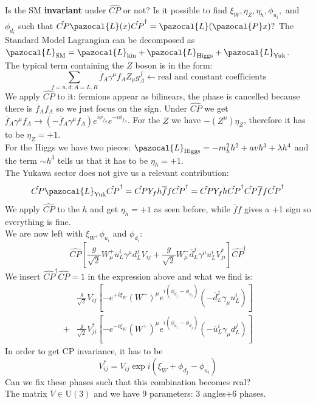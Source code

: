 \documentclass[../main.tex]{subfiles}
\begin{document}
Is the SM \textbf{invariant} under $\hat{CP}$ or not?  Is it possible to find $\xi_W, \eta_Z, \eta_h, \phi_{u_i},$ and $\phi_{d_i}$ such that $\hat{CP}\pazocal{L}(x)\hat{CP}^\dagger=\pazocal{L}(\pazocal{P}x)?$ The Standard Model Lagrangian can be decomposed as $\pazocal{L}_{\text{SM}}=\pazocal{L}_{\text{kin}}+\pazocal{L}_{\text{Higgs}}+\pazocal{L}_{\text{Yuk}}$.\\
The typical term containing the $Z$ boson is in the form:
\[
\sum_{f=u,d;A=L,R}\overline{f}_A\gamma^\mu f_AZ_\mu g_A^f\xleftarrow[]{}\text{real and constant coefficients}
\]
We apply $\hat{CP}$ to it: fermions appear as bilinears, the phase is cancelled because there is $\overline{f}_Af_A$ so we just focus on the sign. Under $\hat{CP}$ we get $\overline{f}_A\gamma^\mu f_A\xrightarrow[]{}(-\overline{f}_A\gamma^\mu f_A)e^{i\phi_{f_A}}e^{-i\phi_{f_A}}$. For the $Z$ we have $-(Z^\mu)\eta_Z$, therefore it has to be $\eta_Z=+1$.\\
For the Higgs we have two pieces: $\pazocal{L}_{\text{Higgs}}=-m_h^2h^2+avh^3+\lambda h^4$ and the term $\sim h^3$ tells us that it has to be $\eta_h=+1$.\\
The Yukawa sector does not give us a relevant contribution:
\[
\hat{CP}\pazocal{L}_{\text{Yuk}}\hat{CP}^\dagger=\hat{CP}Y_fh\overline{f}f\hat{CP}^\dagger=\hat{CP}Y_fh\hat{CP}^\dagger\hat{CP}\overline{f}f\hat{CP}^\dagger
\]
We apply $\hat{CP}$ to the $h$ and get $\eta_h=+1$ as seen before, while $\overline{f}f$ gives a +1 sign so everything is fine.\\
We are now left with $\xi_W, \phi_{u_i}$ and $\phi_{d_i}$:
\[
\hat{CP}\left[\frac{g}{\sqrt{2}}W_\mu^+\overline{u}_L^i\gamma^\mu d^j_LV_{ij}+\frac{g}{\sqrt{2}}W_\mu^-\overline{d}_L^j\gamma^\mu u_L^iV_{ji}^*\right]\hat{CP}^\dagger
\]
We insert $\hat{CP}^\dagger\hat{CP}=1$ in the expression above and what we find is:
\begin{align*}
&\frac{g}{\sqrt{2}}V_{ij}\left[-e^{+i\xi_W}(W^-)^\mu e^{i(\phi_{d_j}-\phi_{u_i})}\left(-\overline{d}_L^j\gamma_\mu u_L^i\right)\right]\\
+&\frac{g}{\sqrt{2}}V_{ji}^*\left[-e^{-i\xi_W}(W^+)^\mu e^{i(\phi_{u_i}-\phi_{d_j})}\left(-\overline{u}_L^i\gamma_\mu d_L^j\right)\right]
\end{align*}
In order to get CP invariance, it has to be 
\[
V_{ij}^*=V_{ij}\exp{i(\xi_W+\phi_{d_j}-\phi_{u_i})}
\]
Can we fix these phases such that this combination becomes real?\\
The matrix $V\in$U$(3)$ and we have 9 parameters: 3 angles+6 phases.\\
\end{document}
